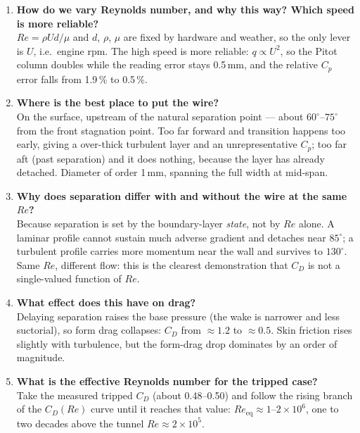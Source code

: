 \documentclass[11pt,a4paper]{article}
\newcommand{\Cp}{\ensuremath{C_p}}
\newcommand{\CD}{\ensuremath{C_D}}
\newcommand{\ReD}{\ensuremath{\mathit{Re}}}
\begin{document}
\begin{enumerate}[leftmargin=1.6em,itemsep=4pt,topsep=2pt]

\item \textbf{How do we vary Reynolds number, and why this way? Which speed is more reliable?}\\
$\ReD = \rho U d/\mu$ and $d$, $\rho$, $\mu$ are fixed by hardware and weather, so the only
lever is $U$, i.e.\ engine rpm. The high speed is more reliable: $q \propto U^2$, so the
Pitot column doubles while the reading error stays 0.5\,mm, and the relative \Cp{} error
falls from 1.9\,\% to 0.5\,\%.

\item \textbf{Where is the best place to put the wire?}\\
On the surface, upstream of the natural separation point --- about $60^\circ$--$75^\circ$
from the front stagnation point. Too far forward and transition happens too early, giving a
over-thick turbulent layer and an unrepresentative \Cp{}; too far aft (past separation) and
it does nothing, because the layer has already detached. Diameter of order 1\,mm, spanning
the full width at mid-span.

\item \textbf{Why does separation differ with and without the wire at the same \ReD?}\\
Because separation is set by the boundary-layer \emph{state}, not by $\ReD$ alone. A laminar
profile cannot sustain much adverse gradient and detaches near $85^\circ$; a turbulent profile
carries more momentum near the wall and survives to $130^\circ$. Same $\ReD$, different
flow: this is the clearest demonstration that $\CD$ is not a single-valued function of $\ReD$.

\item \textbf{What effect does this have on drag?}\\
Delaying separation raises the base pressure (the wake is narrower and less suctorial), so
form drag collapses: $\CD$ from $\approx 1.2$ to $\approx 0.5$. Skin friction rises slightly
with turbulence, but the form-drag drop dominates by an order of magnitude.

\item \textbf{What is the effective Reynolds number for the tripped case?}\\
Take the measured tripped $\CD$ (about 0.48--0.50) and follow the rising branch of the
$\CD(\ReD)$ curve until it reaches that value: $\ReD_{\text{eq}} \approx 1$--$2\times10^{6}$,
one to two decades above the tunnel $\ReD \approx 2\times10^{5}$.


\end{enumerate}
\end{document}
